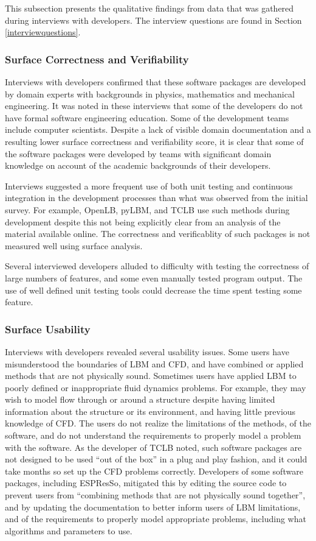 \documentclass[12pt, notitlepage]{article}
\begin{document}
This subsection presents the qualitative findings from data that was gathered during interviews with developers. The interview questions are found in Section \ref{interviewquestions}.

\subsubsection{Surface Correctness and Verifiability}

Interviews with developers confirmed that these software packages are developed by domain experts with backgrounds in physics, mathematics and mechanical engineering. It was noted in these interviews that some of the developers do not have formal software engineering education. Some of the development teams include computer scientists. Despite a lack of visible domain documentation and a resulting lower surface correctness and verifiability score, it is clear that some of the software packages were developed by teams with significant domain knowledge on account of the academic backgrounds of their developers. 

Interviews suggested a more frequent use of both unit testing and continuous integration in the development processes than what was observed from the initial survey. For example, OpenLB, pyLBM, and TCLB use such methods during development despite this not being explicitly clear from an analysis of the material available online. The correctness and verificablity of such packages is not measured well using surface analysis.

Several interviewed developers alluded to difficulty with testing the correctness of large numbers of features, and some even manually tested program output. The use of well defined unit testing tools could decrease the time spent testing some feature.

\subsubsection{Surface Usability}

Interviews with developers revealed several usability issues. Some users have misunderstood the boundaries of LBM and CFD, and have combined or applied methods that are not physically sound. Sometimes users have applied LBM to poorly defined or inappropriate fluid dynamics problems. For example, they may wish to model flow through or around a structure despite having limited information about the structure or its environment, and having little previous knowledge of CFD. The users do not realize the limitations of the methods, of the software, and do not understand the requirements to properly model a problem with the software. As the developer of TCLB noted, such software packages are not designed to be used ``out of the box'' in a plug and play fashion, and it could take months so set up the CFD problems correctly. Developers of some software packages, including ESPResSo, mitigated this by editing the source code to prevent users from ``combining methods that are not physically sound together'', and by updating the documentation to better inform users of LBM limitations, and of the requirements to properly model appropriate problems, including what algorithms and parameters to use. 
\end{document}
